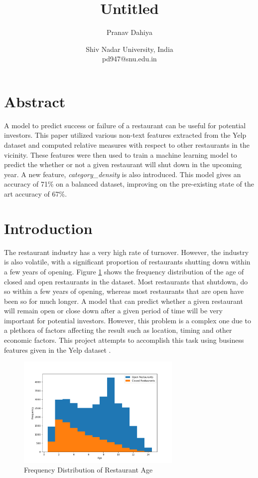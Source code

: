 \documentclass[12pt]{article}
\title{Untitled}
\author{Pranav Dahiya}
\date{Shiv Nadar University, India\\pd947@snu.edu.in}
\begin{document}
  \maketitle

  \section*{Abstract}

  A model to predict success or failure of a restaurant can be useful for potential investors. This paper utilized various non-text features extracted from the Yelp dataset and computed relative measures with respect to other restaurants in the vicinity. These features were then used to train a machine learning model to predict the whether or not a given restaurant will shut down in the upcoming year. A new feature, \emph{category\_density} is also introduced. This model gives an accuracy of 71\% on a balanced dataset, improving on the pre-existing state of the art accuracy of 67\%.

  \section{Introduction}

  The restaurant industry has a very high rate of turnover. However, the industry is also volatile, with a significant proportion of restaurants shutting down within a few years of opening. Figure \ref{fig:age} shows the frequency distribution of the age of closed and open restaurants in the dataset. Most restaurants that shutdown, do so within a few years of opening, whereas most restaurants that are open have been so for much longer. A model that can predict whether a given restaurant will remain open or close down after a given period of time will be very important for potential investors. However, this problem is a complex one due to a plethora of factors affecting the result such as location, timing and other economic factors. This project attempts to accomplish this task using business features given in the Yelp dataset \cite{yelp}.

  \begin{figure}[H]
    \centering
    \includegraphics[width=0.7\textwidth]{Figure_1.png}
    \caption{Frequency Distribution of Restaurant Age}
    \label{fig:age}
  \end{figure}
\end{document}
